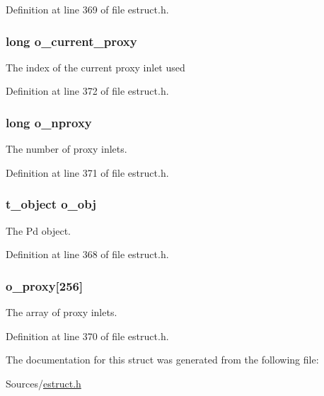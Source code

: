 Definition at line 369 of file estruct.\-h.

\hypertarget{struct__eobj_a32a8921c66d63fcccc9df035f6b9160f}{
\subsubsection[{o\-\_\-current\-\_\-proxy}]{\setlength{\rightskip}{0pt plus 5cm}long o\-\_\-current\-\_\-proxy}}\label{struct__eobj_a32a8921c66d63fcccc9df035f6b9160f}
The index of the current proxy inlet used 

Definition at line 372 of file estruct.\-h.

\hypertarget{struct__eobj_a5959b8f1e0726d2a7d82a4d39ae803bb}{
\subsubsection[{o\-\_\-nproxy}]{\setlength{\rightskip}{0pt plus 5cm}long o\-\_\-nproxy}}\label{struct__eobj_a5959b8f1e0726d2a7d82a4d39ae803bb}
The number of proxy inlets. 

Definition at line 371 of file estruct.\-h.

\hypertarget{struct__eobj_a8cffa8f3338cca7779ab922dab19227c}{
\subsubsection[{o\-\_\-obj}]{\setlength{\rightskip}{0pt plus 5cm}t\-\_\-object o\-\_\-obj}}\label{struct__eobj_a8cffa8f3338cca7779ab922dab19227c}
The Pd object. 

Definition at line 368 of file estruct.\-h.

\hypertarget{struct__eobj_a9435dcf0a1aed105a4c38d24dfc65dbf}{
\subsubsection[{o\-\_\-proxy}]{ o\-\_\-proxy\mbox{[}256\mbox{]}}}\label{struct__eobj_a9435dcf0a1aed105a4c38d24dfc65dbf}
The array of proxy inlets. 

Definition at line 370 of file estruct.\-h.



The documentation for this struct was generated from the following file\-:\begin{DoxyCompactItemize}
\item 
Sources/\hyperlink{estruct_8h}{estruct.\-h}\end{DoxyCompactItemize}
